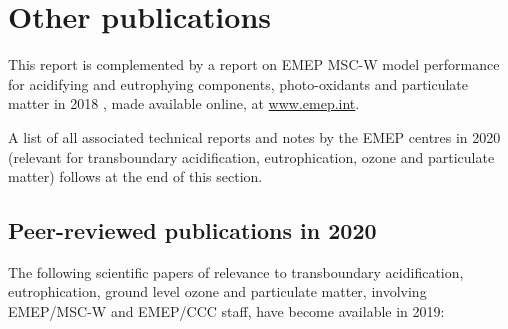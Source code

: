 \section{Other publications}
\label{sec:publ}
This report is complemented by a report on EMEP MSC-W model performance for acidifying and eutrophying components, photo-oxidants and particulate matter in 2018 \citep{WEB2020:Eval}, made available online, at \url{www.emep.int}.



A list of all associated technical reports and notes  by the EMEP
centres in 2020 (relevant for transboundary acidification, eutrophication,
ozone and particulate matter) follows at the end of this section.

\subsection*{Peer-reviewed publications in 2020}

The following scientific papers of relevance to transboundary acidification, eutrophication, ground level ozone and particulate matter, involving EMEP/MSC-W and EMEP/CCC staff, have become available in 2019:

